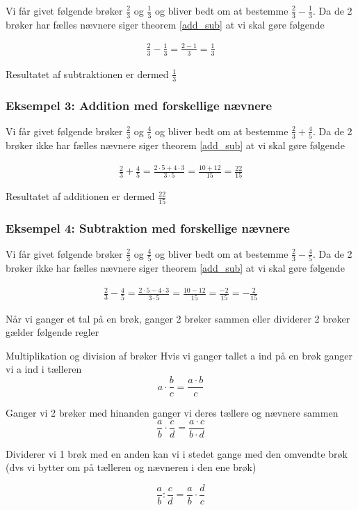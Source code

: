Vi får givet følgende brøker $\frac{2}{3}$ og $\frac{1}{3}$ og bliver bedt om at bestemme $\frac{2}{3} - \frac{1}{3}$. Da de 2 brøker har fælles nævnere siger theorem \ref{add_sub} at vi skal gøre følgende

\begin{align*}
\frac{2}{3} - \frac{1}{3} = \frac{2 - 1}{3} = \frac{1}{3}
\end{align*}

Resultatet af subtraktionen er dermed $\frac{1}{3}$

\subsubsection*{Eksempel 3: Addition med forskellige nævnere}

Vi får givet følgende brøker $\frac{2}{3}$ og $\frac{4}{5}$ og bliver bedt om at bestemme $\frac{2}{3} + \frac{4}{5}$. Da de 2 brøker ikke har fælles nævnere siger theorem \ref{add_sub} at vi skal gøre følgende

\begin{align*}
\frac{2}{3} + \frac{4}{5} = \frac{2\cdot 5 + 4\cdot 3}{3\cdot 5} = \frac{10 + 12}{15} = \frac{22}{15}
\end{align*}

Resultatet af additionen er dermed $\frac{22}{15}$

\subsubsection*{Eksempel 4: Subtraktion med forskellige nævnere}

Vi får givet følgende brøker $\frac{2}{3}$ og $\frac{4}{5}$ og bliver bedt om at bestemme $\frac{2}{3} - \frac{4}{5}$. Da de 2 brøker ikke har fælles nævnere siger theorem \ref{add_sub} at vi skal gøre følgende

\begin{align*}
\frac{2}{3} - \frac{4}{5} = \frac{2\cdot 5 - 4\cdot 3}{3\cdot 5} = \frac{10 - 12}{15} = \frac{-2}{15} = -\frac{2}{15}
\end{align*}


Når vi ganger et tal på en brøk, ganger 2 brøker sammen eller dividerer 2 brøker gælder følgende regler

\begin{frm-thm}{Multiplikation og division af brøker}
Hvis vi ganger tallet a ind på en brøk ganger vi a ind i tælleren
\[a\cdot \frac{b}{c} = \frac{a\cdot b}{c}\]

Ganger vi 2 brøker med hinanden ganger vi deres tællere og nævnere sammen
\[\frac{a}{b} \cdot \frac{c}{d} = \frac{a\cdot c}{b\cdot d} \]

Dividerer vi 1 brøk med en anden kan vi i stedet gange med den omvendte brøk (dvs vi bytter om på tælleren og nævneren i den ene brøk)

\[\frac{a}{b} : \frac{c}{d} = \frac{a}{b} \cdot \frac{d}{c}\]
\end{frm-thm}

